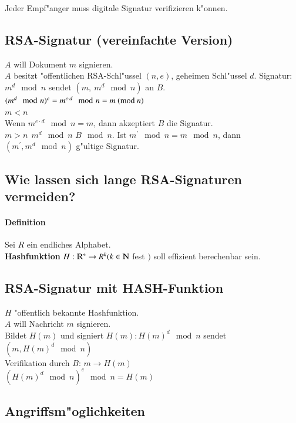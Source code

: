 Jeder Empf"anger muss digitale Signatur verifizieren k"onnen.

\subsection{RSA-Signatur (vereinfachte Version)}

$A$ will Dokument $m$ signieren. \\
$A$ besitzt "offentlichen RSA-Schl"ussel $(n,e)$, geheimen Schl"ussel $d$.
Signatur: $m^d \mod{n}$ sendet $(m,\ m^d \mod{n})$ an $B$.\\
$(m^d \mod{n})^e = m^{e \cdot d} \mod{n} = m\ (\md{n})$\\
$m < n$\\
Wenn $m^{e \cdot d} \mod{n} = m$, dann akzeptiert $B$ die Signatur.\\
$m > n\ \ m^d \mod{n}$ $B \mod{n}$. Ist $m^{'} \mod{n} = m \mod{n}$, dann $(m^{'},m^d \mod{n})$ g"ultige Signatur.

\subsection{Wie lassen sich lange RSA-Signaturen vermeiden?}
\paragraph{Definition}

Sei $R$ ein endliches Alphabet.\\
\textbf{Hashfunktion} $H: \R^{*} \rightarrow R^k (k \in \N$ fest $)$ soll effizient berechenbar sein.

\subsection{RSA-Signatur mit HASH-Funktion}

$H$ "offentlich bekannte Hashfunktion.\\
$A$ will Nachricht $m$ signieren.\\
Bildet $H(m)$ und signiert $H(m) : H(m)^d \mod{n}$ sendet $(m, H(m)^d \mod{n})$\\
Verifikation durch $B$: $m \rightarrow H(m)$\\
$(H(m)^d \mod{n})^e \mod{n} = H(m)$

\subsection{Angriffsm"oglichkeiten}

